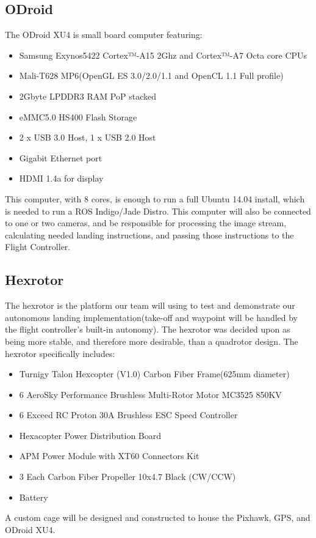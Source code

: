 \subsection{ODroid}
The ODroid XU4 is small board computer featuring:
\begin{itemize}
\item Samsung Exynos5422 Cortex™-A15 2Ghz and Cortex™-A7 Octa core CPUs
\item Mali-T628 MP6(OpenGL ES 3.0/2.0/1.1 and OpenCL 1.1 Full profile)
\item 2Gbyte LPDDR3 RAM PoP stacked
\item eMMC5.0 HS400 Flash Storage
\item 2 x USB 3.0 Host, 1 x USB 2.0 Host
\item Gigabit Ethernet port
\item HDMI 1.4a for display
\end{itemize}
\noindent This computer, with 8 cores, is enough to run a full Ubuntu 14.04 install, which is needed to run a ROS Indigo/Jade Distro. This computer will also be connected to one or two cameras, and be responsible for processing the image stream, calculating needed landing instructions, and passing those instructions to the Flight Controller.

\subsection{Hexrotor}
The hexrotor is the platform our team will using to test and demonstrate our autonomous landing implementation(take-off and waypoint will be handled by the flight controller's built-in autonomy). The hexrotor was decided upon as being more stable, and therefore more desirable, than a quadrotor design. The hexrotor specifically includes:
\begin{itemize}
\item Turnigy Talon Hexcopter (V1.0) Carbon Fiber Frame(625mm diameter)
\item 6 AeroSky Performance Brushless Multi-Rotor Motor MC3525 850KV
\item 6 Exceed RC Proton 30A Brushless ESC Speed Controller
\item Hexacopter Power Distribution Board
\item APM Power Module with XT60 Connectors Kit
\item 3 Each Carbon Fiber Propeller 10x4.7 Black (CW/CCW)
\item Battery
\end{itemize}
A custom cage will be designed and constructed to house the Pixhawk, GPS, and ODroid XU4. 

